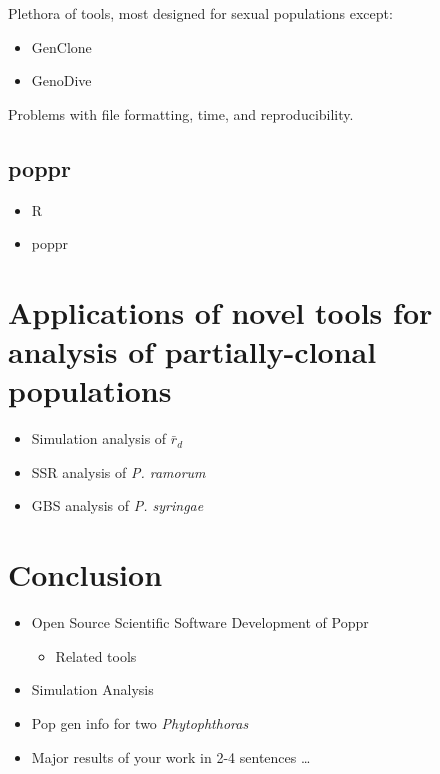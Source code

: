 \documentclass[double,12pt]{beavtex}
\providecommand{\tightlist}{%
  \setlength{\itemsep}{0pt}\setlength{\parskip}{0pt}}
\begin{document}
  Plethora of tools, most designed for sexual populations except:
  
  \begin{itemize}
  \tightlist
  \item
    GenClone
  \item
    GenoDive
  \end{itemize}
  
  Problems with file formatting, time, and reproducibility.
  
  \subsection{poppr}\label{poppr}
  
  \begin{itemize}
  \tightlist
  \item
    R
  \item
    poppr
  \end{itemize}
  
  \section{Applications of novel tools for analysis of partially-clonal
  populations}\label{applications-of-novel-tools-for-analysis-of-partially-clonal-populations}
  
  \begin{itemize}
  \tightlist
  \item
    Simulation analysis of \(\bar{r}_d\)
  \item
    SSR analysis of \emph{P. ramorum}
  \item
    GBS analysis of \emph{P. syringae}
  \end{itemize}
  
  \section{Conclusion}\label{conclusion}
  
  \begin{itemize}
  \tightlist
  \item
    Open Source Scientific Software Development of Poppr
  
    \begin{itemize}
    \tightlist
    \item
      Related tools
    \end{itemize}
  \item
    Simulation Analysis
  \item
    Pop gen info for two \emph{Phytophthoras}
  \item
    Major results of your work in 2-4 sentences \ldots{}
  \end{itemize}
  
\end{document}

